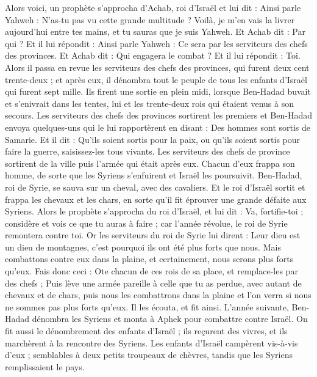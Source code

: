 \begin{multicols}{2}
Alors voici, un prophète s'approcha d'Achab, roi d'Israël et lui dit : Ainsi parle Yahweh : N'as-tu pas vu cette grande multitude ? Voilà, je m'en vais la livrer aujourd'hui entre tes mains, et tu sauras que je suis Yahweh.
Et Achab dit : Par qui ? Et il lui répondit : Ainsi parle Yahweh : Ce sera par les serviteurs des chefs des provinces. Et Achab dit : Qui engagera le combat ? Et il lui répondit : Toi.
Alors il passa en revue les serviteurs des chefs des provinces, qui furent deux cent trente-deux ; et après eux, il dénombra tout le peuple de tous les enfants d'Israël qui furent sept mille.
Ils firent une sortie en plein midi, lorsque Ben-Hadad buvait et s'enivrait dans les tentes, lui et les trente-deux rois qui étaient venus à son secours.
Les serviteurs des chefs des provinces sortirent les premiers et Ben-Hadad envoya quelques-uns qui le lui rapportèrent en disant : Des hommes sont sortis de Samarie.
Et il dit : Qu'ils soient sortis pour la paix, ou qu'ils soient sortis pour faire la guerre, saisissez-les tous vivants.
Les serviteurs des chefs de province sortirent de la ville puis l'armée qui était après eux.
Chacun d'eux frappa son homme, de sorte que les Syriens s'enfuirent et Israël les poursuivit. Ben-Hadad, roi de Syrie, se sauva sur un cheval, avec des cavaliers.
Et le roi d'Israël sortit et frappa les chevaux et les chars, en sorte qu'il fit éprouver une grande défaite aux Syriens.
Alors le prophète s'approcha du roi d'Israël, et lui dit : Va, fortifie-toi ; considère et vois ce que tu auras à faire ; car l'année révolue, le roi de Syrie remontera contre toi.
Or les serviteurs du roi de Syrie lui dirent : Leur dieu est un dieu de montagnes, c'est pourquoi ils ont été plus forts que nous. Mais combattons contre eux dans la plaine, et certainement, nous serons plus forts qu'eux.
Fais donc ceci : Ote chacun de ces rois de sa place, et remplace-les par des chefs ;
Puis lève une armée pareille à celle que tu as perdue, avec autant de chevaux et de chars, puis nous les combattrons dans la plaine et l'on verra si nous ne sommes pas plus forts qu'eux. Il les écouta, et fit ainsi.
L'année suivante, Ben-Hadad dénombra les Syriens et monta à Aphek pour combattre contre Israël.
On fit aussi le dénombrement des enfants d'Israël ; ils reçurent des vivres, et ils marchèrent à la rencontre des Syriens. Les enfants d'Israël campèrent vis-à-vis d'eux ; semblables à deux petits troupeaux de chèvres, tandis que les Syriens remplissaient le pays.

\end{multicols}
